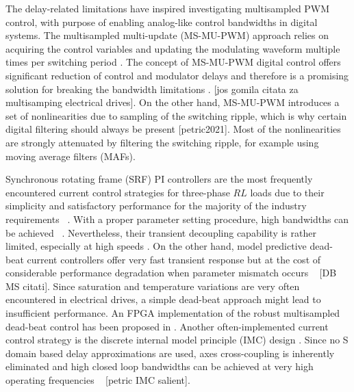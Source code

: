 \documentclass[journal]{IEEEtran}
\begin{document}
The delay-related limitations have inspired investigating multisampled PWM control, with purpose of enabling analog-like control bandwidths in digital systems. The multisampled multi-update (MS-MU-PWM) approach relies on acquiring the control variables and updating the modulating waveform multiple times per switching period \cite{corradini_analysis}. The concept of MS-MU-PWM digital control offers significant reduction of control and modulator delays and therefore is a promising solution for breaking the bandwidth limitations \cite{corradini2018}. [jos gomila citata za multisamping electrical drives]. On the other hand, MS-MU-PWM introduces a set of nonlinearities due to sampling of the switching ripple, which is why certain digital filtering should always be present [petric2021]. Most of the nonlinearities are strongly attenuated by filtering the switching ripple, for example using moving average filters (MAFs).

Synchronous rotating frame (SRF) PI controllers are the most frequently encountered current control strategies for three-phase $RL$ loads due to their simplicity and satisfactory performance for the majority of the industry requirements ~\cite{rowan1986,bae2003,yepes2014}. With a proper parameter setting procedure, high bandwidths can be achieved ~\cite{yepes2014,holmes2009}. Nevertheless, their transient decoupling capability is rather limited, especially at high speeds \cite{lorenz2000}. On the other hand, model predictive dead-beat current controllers offer very fast transient response but at the cost of considerable performance degradation when parameter mismatch occurs ~\cite{malesani1999,xu2019} [DB MS citati]. Since saturation and temperature variations are very often encountered in electrical drives, a simple dead-beat approach might lead to insufficient performance. An FPGA implementation of the robust multisampled dead-beat control has been proposed in \cite{rovere2018}. Another often-implemented current control strategy is the discrete internal model principle (IMC) design \cite{lorenz2010}. Since no S domain based delay approximations are used, axes cross-coupling is inherently eliminated and high closed loop bandwidths can be achieved at very high operating frequencies ~\cite{commentsHoffmann,vuksa2016} [petric IMC salient].
\end{document}
